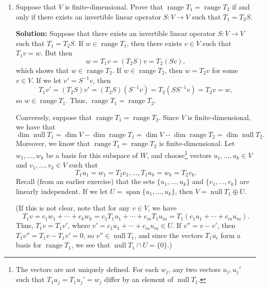 \documentclass[letterpaper,12pt]{article}
\DeclareMathOperator{\nul}{null}
\DeclareMathOperator{\range}{range}
\DeclareMathOperator{\spn}{span}
\begin{document}
\begin{enumerate}
\begin{enumerate}
\bigskip

 \item Suppose that $V$ is finite-dimensional. Prove that $\range T_1=\range T_2$ if and only if there exists an invertible linear operator $S:V\to V$ such that $T_1=T_2S$.

\bigskip

{\bf Solution:} Suppose that there exists an invertible linear operator $S:V\to V$ such that $T_1=T_2S$. If $w\in \range T_1$, then there exists $v\in V$ such that $T_1v=w$. But then 
\[
 w=T_1v = (T_2S)v = T_2(Sv),
\]
which shows that $w\in \range T_2$. If $w\in \range T_2$, then $w=T_2v$ for some $v\in V$. If we let $v'=S^{-1}v$, then
\[
 T_1v' = (T_2S)v' = (T_2S)(S^{-1}v) = T_2(SS^{-1}v) = T_2v = w,
\]
so $w\in \range T_1$. Thus, $\range T_1=\range T_2$.

Conversely, suppose that $\range T_1=\range T_2$. Since $V$ is finite-dimensional, we have that
\[
 \dim\nul T_1 = \dim V-\dim\range T_1 = \dim V-\dim\range T_2 = \dim\nul T_2.
\]
Moreover, we know that $\range T_1=\range T_2$ is finite-dimensional. Let $w_1,\ldots, w_k$ be a basis for this subspace of $W$, and choose\footnote{The vectors are not uniquely defined. For each $w_j$, any two vectors $u_j, u_j'$ such that $T_1u_j=T_1u_j'=w_j$ differ by an element of $\nul T_1$.} vectors $u_1,\ldots, u_k\in V$ and $v_1,\ldots, v_k\in V$ such that
\[
 T_1u_1=w_1=T_2v_1,\ldots, T_1u_k=w_k=T_2v_k.
\]
Recall (from an earlier exercise) that the sets $\{u_1,\ldots, u_k\}$ and $\{v_1,\ldots, v_k\}$ are linearly independent. If we let $U = \spn\{u_1,\ldots, u_k\}$, then $V=\nul T_1\oplus U$.

(If this is not clear, note that for any $v\in V$, we have
\[
 T_1v = c_1w_1+\cdots+c_kw_k = c_1T_1u_1+\cdots+c_mT_1u_m = T_1(c_1u_1+\cdots+c_mu_m).
\]
Thus, $T_1v = T_1v'$, where $v'=c_1u_1+\cdots +c_mu_m\in U$. If $v'' = v-v'$, then $T_1v''=T_1v-T_1v' = 0$, so $v''\in\nul T_1$, and since the vectors $T_1u_i$ form a basis for $\range T_1$, we see that $\nul T_1\cap U = \{0\}$.)


\end{enumerate}
\end{enumerate}
\end{document}
